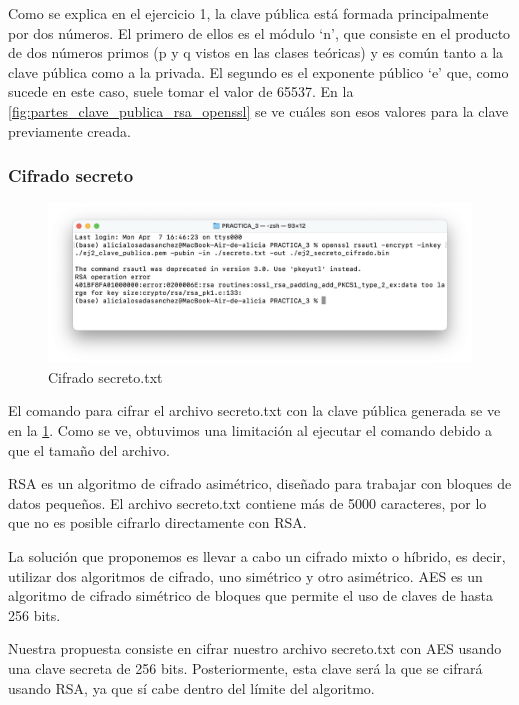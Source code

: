 Como se explica en el ejercicio 1, la clave pública está formada principalmente por dos números. El primero de ellos es el módulo ‘n’, que consiste en el producto de dos números primos (p y q vistos en las clases teóricas) y es común tanto a la clave pública como a la privada. El segundo es el exponente público ‘e’ que, como sucede en este caso, suele tomar el valor de 65537. En la \ref{fig:partes_clave_publica_rsa_openssl} se ve cuáles son esos valores para la clave previamente creada. 

\subsubsection{Cifrado secreto}

\begin{figure}[H]   
    \includegraphics[width=15cm]{ej2_c.png}
    \caption{Cifrado secreto.txt}
    \label{fig:cifrado_secreto_openssl}
\end{figure}

El comando para cifrar el archivo secreto.txt con la clave pública generada se ve en la \ref{fig:cifrado_secreto_openssl}. Como se ve, obtuvimos una limitación al ejecutar el comando debido a que el tamaño del archivo.  

RSA es un algoritmo de cifrado asimétrico, diseñado para trabajar con bloques de datos pequeños. El archivo secreto.txt contiene más de 5000 caracteres, por lo que no es posible cifrarlo directamente con RSA. 

La solución que proponemos es llevar a cabo un cifrado mixto o híbrido, es decir, utilizar dos algoritmos de cifrado, uno simétrico y otro asimétrico. AES es un algoritmo de cifrado simétrico de bloques que permite el uso de claves de hasta 256 bits. 

Nuestra propuesta consiste en cifrar nuestro archivo secreto.txt con AES usando una clave secreta de 256 bits. Posteriormente, esta clave será la que se cifrará usando RSA, ya que sí cabe dentro del límite del algoritmo. 